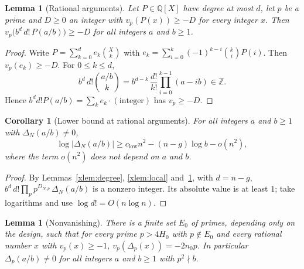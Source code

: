 \documentclass[11pt]{article}
\newtheorem{lemma}[theorem]{Lemma}
\newtheorem{corollary}[theorem]{Corollary}
\theoremstyle{definition}
\begin{document}
\begin{lemma}[Rational arguments]\label{xlem:binomial}
Let $P\in\mathbb Q[X]$ have degree at most $d$, let $p$ be a prime and $D\ge0$ an integer with $v_p(P(x))\ge-D$ for every integer $x$. Then $v_p\big(b^d\,d!\,P(a/b)\big)\ge-D$ for all integers $a$ and $b\ge1$.
\end{lemma}

\begin{proof}
Write $P=\sum_{k=0}^de_k\binom Xk$ with $e_k=\sum_{i=0}^k(-1)^{k-i}\binom kiP(i)$. Then $v_p(e_k)\ge-D$. For $0\le k\le d$,
\[
b^d\,d!\binom{a/b}{k}=b^{d-k}\,\frac{d!}{k!}\prod_{i=0}^{k-1}(a-ib)\in\mathbb Z .
\]
Hence $b^dd!P(a/b)=\sum_ke_k\cdot(\text{integer})$ has $v_p\ge-D$.
\end{proof}

\begin{corollary}[Lower bound at rational arguments]\label{xcor:lower}
For all integers $a$ and $b\ge1$ with $\Delta_N(a/b)\ne0$,
\[
\log|\Delta_N(a/b)|\ge c_{\mathrm{low}}n^2-(n-g)\log b-o(n^2),
\]
where the term $o(n^2)$ does not depend on $a$ and $b$.
\end{corollary}

\begin{proof}
By Lemmas~\ref{xlem:degree}, \ref{xlem:local} and~\ref{xlem:binomial}, with $d=n-g$, $b^{d}\,d!\prod_pp^{D_{N,p}}\,\Delta_N(a/b)$ is a nonzero integer. Its absolute value is at least $1$; take logarithms and use $\log d!=O(n\log n)$.
\end{proof}

\begin{lemma}[Nonvanishing]\label{xlem:nonzero}
There is a finite set $E_0$ of primes, depending only on the design, such that for every prime $p>4H_0$ with $p\notin E_0$ and every rational number $x$ with $v_p(x)\ge-1$, $v_p(\Delta_p(x))=-2n_0p$. In particular $\Delta_p(a/b)\ne0$ for all integers $a$ and $b\ge1$ with $p^2\nmid b$.
\end{lemma}
\end{document}
